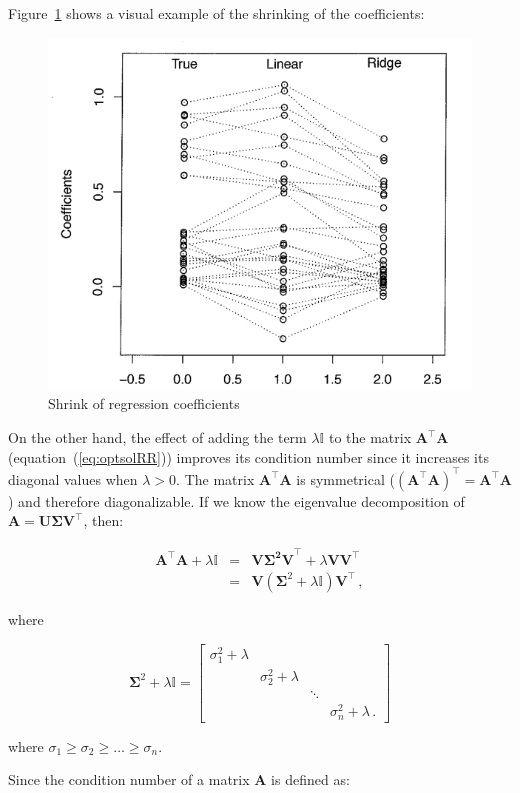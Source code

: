 Figure~\ref{fig:shrinks} shows a visual example of the shrinking of the
coefficients:

\begin{figure}[h!]
\includegraphics[width=0.5\linewidth]{img/shrinks}
\caption{Shrink of regression coefficients}
\label{fig:shrinks}
\end{figure}


On the other hand, the effect of adding the term $\lambda \mathbb{I}$
to the matrix $\mathbf{A}^\top \mathbf{A}$
(equation~(\ref{eq:optsolRR})) improves its condition number since it
increases its diagonal values when $\lambda > 0 $.  The matrix
$\mathbf{A}^\top \mathbf{A}$ is symmetrical ($(\mathbf{A}^\top
\mathbf{A})^\top = \mathbf{A}^\top \mathbf{A}$) and therefore
diagonalizable.  If we know the eigenvalue decomposition of $\mathbf{A}
= \mathbf{U\Sigma V^\top}$, then:

\begin{eqnarray*}
\mathbf{A}^\top \mathbf{A}+\lambda \mathbb{I}&=&\mathbf{V\Sigma^2
V}^\top + \lambda \mathbf{V} \mathbf{V}^\top\\ &=&\mathbf{V}
(\mathbf{\Sigma}^2+\lambda\mathbb{I}) \mathbf{V}^\top \, ,
\end{eqnarray*}

\noindent where

\begin{equation*}
\mathbf{\Sigma}^2+\lambda\mathbb{I}=
\begin{bmatrix}
\sigma^2_1 + \lambda & \, & \, \\
\, & \sigma^2_2 +\lambda & \, \\
\, & \, & \ddots & \, \\
\, & \, & \, & \sigma^2_n +\lambda \, .
\end{bmatrix}
\end{equation*}

where $\sigma_1 \geq \sigma_2 \geq \dots \geq \sigma_n$.

Since the condition number of a matrix $\mathbf{A}$ is defined as:

